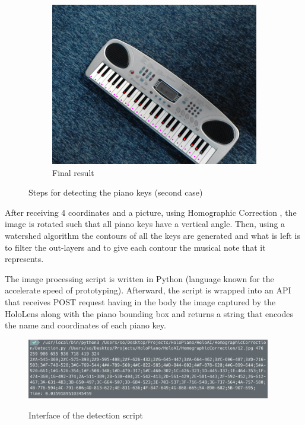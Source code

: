 \documentclass[12 pct]{report}
\begin{document}
\begin{figure}[H]
\begin{subfigure}[b]{0.7\linewidth}
    \includegraphics[width=\linewidth]{piano-pointsv2}
    \caption{Final result}
  \end{subfigure}
  \caption{Steps for detecting the piano keys (second case)}
  \label{fig:coffee3}
\end{figure}

After receiving 4 coordinates and a picture, using Homographic Correction \cite{opencvhomography} , the image is rotated such that all piano keys have a vertical angle. Then, using a watershed algorithm  \cite{wang2009image}  the contours of all the keys are generated and what is left is to filter the out-layers and to give each contour the musical note that it represents. 

The image processing script is written in Python \cite{oliphant2007python} (language known for the accelerate speed of prototyping). Afterward, the script is wrapped into an API that receives POST request having in the body the image captured by the HoloLens along with the piano bounding box and returns a string that encodes the name and coordinates of each piano key.

\begin{figure}[H]
\includegraphics[width=0.95\textwidth]{holopiano-detection}
\centering
\label{fig:feature-points}
\caption{Interface of the detection script}
\end{figure}
\end{document}
